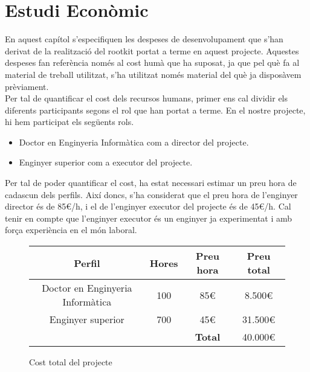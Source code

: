 \chapter{Estudi Econòmic}

En aquest capítol s'especifiquen les despeses de desenvolupament que s'han derivat de la realització
del rootkit portat a terme en aquest projecte. Aquestes despeses fan referència només al cost humà que
ha suposat, ja que pel què fa al material de treball utilitzat, s'ha utilitzat només material del què
ja disposàvem prèviament. \\

Per tal de quantificar el cost dels recursos humans, primer ens cal dividir els diferents participants
segons el rol que han portat a terme. En el nostre projecte, hi hem participat els següents rols.

\begin{itemize}
\item Doctor en Enginyeria Informàtica com a director del projecte.
\item Enginyer superior com a executor del projecte.
\end{itemize}

Per tal de poder quantificar el cost, ha estat necessari estimar un preu hora de
cadascun dels perfils. Així doncs, s'ha considerat que el preu hora de l'enginyer director és de 85\euro/h,
i el de l'enginyer executor del projecte és de 45\euro/h. Cal tenir en compte que l'enginyer executor és un
enginyer ja experimentat i amb força experiència en el món laboral. \\

\begin{figure}[htp]
\centering
\begin{tabular}{c c c c}
	\textbf{Perfil} & \textbf{Hores} & \textbf{Preu hora} & \textbf{Preu total} \\
	\hline
	Doctor en Enginyeria Informàtica & 100 & 85\euro & 8.500\euro \\
	Enginyer superior & 700 & 45\euro & 31.500\euro \\
	& & \textbf{Total} & 40.000\euro \\
\end{tabular}
\caption{Cost total del projecte}
\label{fig:costProjecte}
\end{figure}

